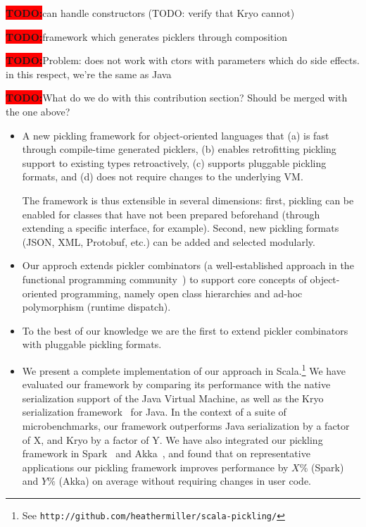 \documentclass[preprint,10pt]{sigplanconf}
\newcommand{\todo}{{\bf \colorbox{red}{\color{white}TODO:}}}
\begin{document}
\todo can handle constructors (TODO: verify that Kryo cannot)

\todo framework which generates picklers through composition

\todo Problem: does not work with ctors with parameters which do side effects. in this respect, we're the same as Java

\todo What do we do with this contribution section? Should be merged with the one above?

\begin{itemize}

\item A new pickling framework for object-oriented languages that (a)
  is fast through compile-time generated picklers, (b) enables
  retrofitting pickling support to existing types retroactively, (c)
  supports pluggable pickling formats, and (d) does not require
  changes to the underlying VM.

  The framework is thus extensible in several dimensions: first,
  pickling can be enabled for classes that have not been prepared
  beforehand (through extending a specific interface, for
  example). Second, new pickling formats (JSON, XML, Protobuf, etc.)
  can be added and selected modularly.

\item Our approch extends pickler combinators (a well-established
  approach in the functional programming
  community~\cite{Kennedy,Elsman}) to support core concepts of
  object-oriented programming, namely open class hierarchies and
  ad-hoc polymorphism (runtime dispatch).

\item To the best of our knowledge we are the first to extend pickler
  combinators with pluggable pickling formats.

\item We present a complete implementation of our approach in
  Scala.\footnote{See
    \texttt{http://github.com/heathermiller/scala-pickling/}} We have
  evaluated our framework by comparing its performance with the native
  serialization support of the Java Virtual Machine, as well as the
  Kryo serialization framework~\cite{Kryo} for Java. In the context of
  a suite of microbenchmarks, our framework outperforms Java
  serialization by a factor of X, and Kryo by a factor of Y. We have
  also integrated our pickling framework in Spark~\cite{Zaharia2010}
  and Akka~\cite{Akka}, and found that on representative applications
  our pickling framework improves performance by $X \%$ (Spark) and $Y
  \%$ (Akka) on average without requiring changes in user code.

\end{itemize}
\end{document}
